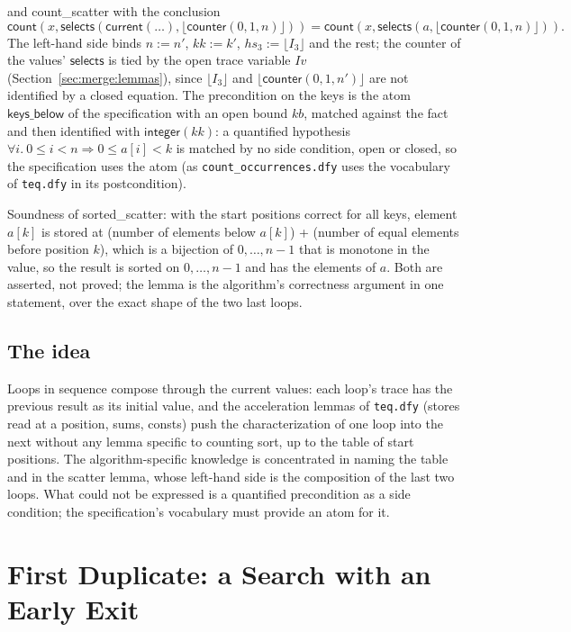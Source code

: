 \documentclass[11pt,a4paper]{article}
\newcommand{\bl}[1]{\lfloor #1\rfloor}                       %
\newcommand{\cnt}{\mathsf{counter}}
\newcommand{\cur}{\mathsf{current}}
\newcommand{\intf}{\mathsf{integer}}
\newcommand{\lemma}[1]{\textsf{#1}}
\begin{document}
and \lemma{count\_scatter} with the conclusion
\[ \mathsf{count}(x, \mathsf{selects}(\cur(\ldots), \bl{\cnt(0, 1, n)})) = \mathsf{count}(x, \mathsf{selects}(a, \bl{\cnt(0, 1, n)})). \]
The left-hand side binds $n := n'$, $kk := k'$, $hs_3 := \bl{I_3}$ and the rest; the counter of the
values' $\mathsf{selects}$ is tied by the open trace variable $Iv$ (Section~\ref{sec:merge:lemmas}), since $\bl{I_3}$ and
$\bl{\cnt(0, 1, n')}$ are not identified by a closed equation. The precondition on the keys is the atom
$\mathsf{keys\_below}$ of the specification with an open bound $kb$, matched against the fact and then
identified with $\intf(kk)$: a quantified hypothesis $\forall i.\ 0 \le i < n \Rightarrow 0 \le a[i] < k$
is matched by no side condition, open or closed, so the specification uses the atom (as
\texttt{count\_occurrences.dfy} uses the vocabulary of \texttt{teq.dfy} in its postcondition).

Soundness of \lemma{sorted\_scatter}: with the start positions correct for all keys, element $a[k]$ is
stored at (number of elements below $a[k]$) + (number of equal elements before position $k$), which is
a bijection of $0, \ldots, n - 1$ that is monotone in the value, so the result is sorted on $0, \ldots, n - 1$
and has the elements of $a$. Both are asserted, not proved; the lemma is the algorithm's correctness
argument in one statement, over the exact shape of the two last loops.

\subsection{The idea}
Loops in sequence compose through the current values: each loop's trace has the previous result as its
initial value, and the acceleration lemmas of \texttt{teq.dfy} (stores read at a position, sums, consts)
push the characterization of one loop into the next without any lemma specific to counting sort, up to
the table of start positions. The algorithm-specific knowledge is concentrated in naming the table and
in the scatter lemma, whose left-hand side is the composition of the last two loops. What could not be
expressed is a quantified precondition as a side condition; the specification's vocabulary must provide
an atom for it.


\section{First Duplicate: a Search with an Early Exit}\label{sec:fd}
\end{document}
